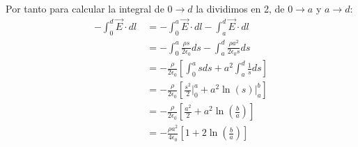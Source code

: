 \documentclass{article}
\begin{document}
Por tanto para calcular la integral de $0\rightarrow d$ la dividimos en 2, de $0\rightarrow a$ y $a\rightarrow d$:
\begin{align*}
  -\int_{0}^{d} \vec{E} \cdot dl \ &= -\int_{0}^{a} \vec{E} \cdot dl -\int_{a}^{d} \vec{E} \cdot dl \\
   &= -\int_{0}^{a} \frac{\rho s}{2\epsilon_{0}} ds -\int_{a}^{d} \frac{\rho a^2}{2\epsilon_{0} s} ds \\
   &= -\frac{\rho}{2\epsilon_{0}} \left[ \int_{0}^{a} s ds + a^2 \int_{a}^{d} \frac{1}{s} ds\right]\\
   &= -\frac{\rho}{2\epsilon_{0}} \left[ \frac{s^2}{2} \bigg|_{0}^{a} + a^2 \ln(s) \bigg|_{a}^{b} \right]\\
   &= -\frac{\rho}{2\epsilon_{0}} \left[ \frac{a^2}{2} + a^2 \ln(\frac{b}{a}) \right]\\
   &= -\frac{\rho a^2}{4\epsilon_{0}} \left[ 1 + 2\ln(\frac{b}{a}) \right]\\
\end{align*}

\begin{center}
\end{center} 
\end{document}
